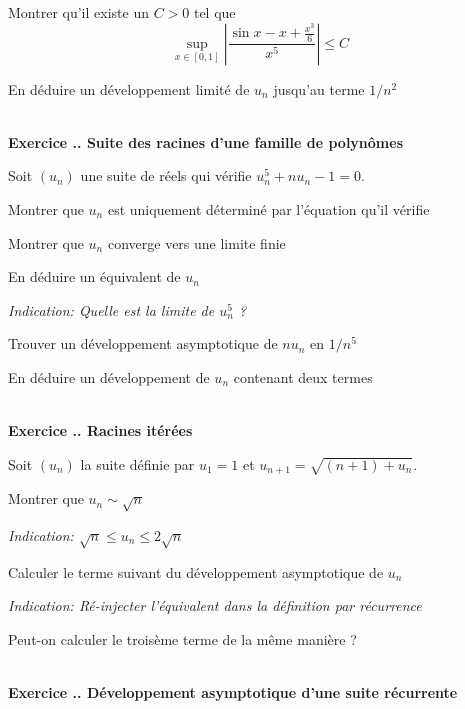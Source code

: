 \documentclass{article}
\newcounter{exo}
\newcommand{\exercice}[1][\null]{\textbf{\\ Exercice \thesection.\theexo. #1} \addtocounter{exo}{1}}
\newcommand{\indication}[1]{\begin{flushright}\textit{Indication: #1}\end{flushright}}
\begin{document}
\begin{compactenum}[(i)]
\item Montrer qu'il existe un $C > 0$ tel que 
    \begin{equation*}
        \sup_{x \in [0,1]} \left| 
            \frac{\sin x - x + \frac{x^3}{6}}{x^5}
        \right| \leq C
    \end{equation*}

\item En déduire un développement limité de $u_n$
    jusqu'au terme $1/n^2$
\end{compactenum}

\exercice[Suite des racines d'une famille de polynômes] 

Soit $(u_n)$ une suite de réels qui vérifie
$u_n^5 + n u_n - 1 = 0$.

\begin{compactenum}[(i)]
\item Montrer que $u_n$ est uniquement déterminé
    par l'équation qu'il vérifie
\item Montrer que $u_n$ converge vers une limite finie
\item En déduire un équivalent de $u_n$
    \indication{Quelle est la limite de $u_n^5$ ? }
\item Trouver un développement asymptotique 
    de $n u_n$ en $1/n^5$
\item En déduire un développement de $u_n$ contenant 
    deux termes
\end{compactenum}

\exercice[Racines itérées]

Soit $(u_n)$ la suite définie par $u_1 = 1$
et $u_{n+1} = \sqrt{ (n+1) + u_n }$.

\begin{compactenum}[(i)]
\item Montrer que $u_n \sim \sqrt{n}$
    \indication{$\sqrt{n} \leq u_n \leq 2 \sqrt{n}$}
\item Calculer le terme suivant du développement 
    asymptotique de $u_n$
    \indication{Ré-injecter l'équivalent dans 
    la définition par récurrence}
\item Peut-on calculer le troisème terme de la même 
    manière ?
\end{compactenum}


\exercice[Développement asymptotique d'une suite récurrente]
\begin{center}
\end{center}
\end{document}
